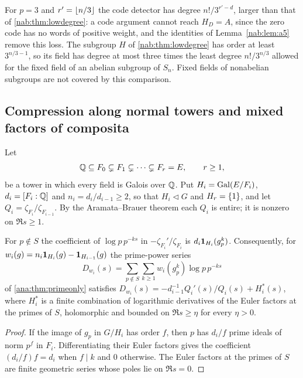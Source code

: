 For $p=3$ and $r'=\lfloor n/3\rfloor$ the code detector has degree $n!/3^{r'-d}$, larger than that of
\cref{nab:thm:lowdegree}: a code argument cannot reach $H_D=A$, since the zero code has no
words of positive weight, and the identities of Lemma~\ref{nab:lem:a5} remove this loss. The
subgroup $H$ of \cref{nab:thm:lowdegree} has order at least $3^{n/3-1}$, so its field has
degree at most three times the least degree $n!/3^{n/3}$ allowed for the fixed field of an
abelian subgroup of $S_n$. Fixed fields of nonabelian subgroups are not covered by this
comparison.

\subsection{Compression along normal towers and mixed factors of composita}\label{nab:sec:tower}
\begingroup\raggedright
{}
\endgroup

Let
\[
 \mathbb{Q}\subseteq F_0\subsetneq F_1\subsetneq\dots\subsetneq F_r=E,\qquad r\ge1,
\]
be a tower in which every field is Galois over $\mathbb{Q}$. Put $H_i=\operatorname{Gal}(E/F_i)$,
$d_i=[F_i:\mathbb{Q}]$ and $n_i=d_i/d_{i-1}\ge2$, so that $H_i\triangleleft G$ and $H_r=\{1\}$,
and let $Q_i=\zeta_{F_i}/\zeta_{F_{i-1}}$. By the Aramata--Brauer theorem
\cite{Brauer1947Zeta,MurtyMurty1997Nonvanishing} each $Q_i$ is entire; it is nonzero on
$\Re s\ge1$.

\begin{lemma}\label{nab:lem:local}
For $p\notin S$ the coefficient of $\log p\,p^{-ks}$ in $-\zeta_{F_i}'/\zeta_{F_i}$ is
$d_i\mathbf{1}_{H_i}(g_p^k)$. Consequently, for
$w_i(g)=n_i\mathbf{1}_{H_i}(g)-\mathbf{1}_{H_{i-1}}(g)$ the prime-power series
\[
  D_{w_i}(s)=\sum_{p\notin S}\sum_{k\ge1}w_i(g_p^k)\log p\,p^{-ks}
\]
of \cref{ana:thm:primeonly} satisfies $D_{w_i}(s)=-d_{i-1}^{-1}Q_i'(s)/Q_i(s)+H_i^*(s)$, where $H_i^*$ is a finite
combination of logarithmic derivatives of the Euler factors at the primes of $S$, holomorphic
and bounded on $\Re s\ge\eta$ for every $\eta>0$.
\end{lemma}
\begin{proof}
If the image of $g_p$ in $G/H_i$ has order $f$, then $p$ has $d_i/f$ prime ideals of norm
$p^f$ in $F_i$. Differentiating their Euler factors gives the coefficient $(d_i/f)f=d_i$
when $f\mid k$ and $0$ otherwise. The Euler factors at the primes of $S$ are finite
geometric series whose poles lie on $\Re s=0$.
\end{proof}

